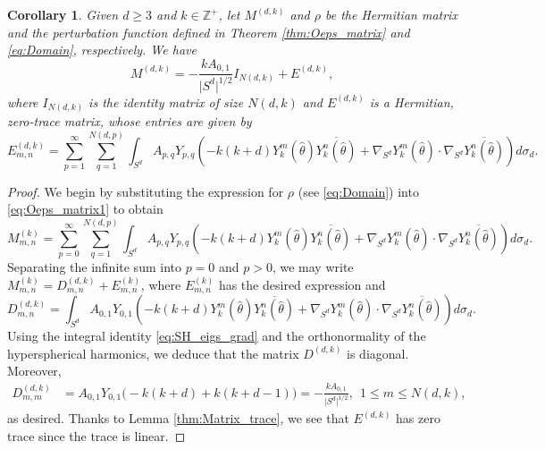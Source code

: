 \documentclass[11pt]{amsart}
\theoremstyle{definition}
\theoremstyle{plain}
\newtheorem{corollary}[definition]{Corollary}
\theoremstyle{remark}
\newcommand{\Z}{\mathbb{Z}}
\newcommand{\abs}[1]{\lvert{#1}\rvert}
\newcommand{\cc}{\overline}
\begin{document}
\begin{corollary} \label{thm:Matrix_sum} 
Given $d\ge 3$ and $k\in\Z^+$, let $M^{(d, k)}$ and $\rho$ be the Hermitian matrix and the perturbation function defined in Theorem \ref{thm:Oeps_matrix} and \eqref{eq:Domain}, respectively. We have 
\begin{equation} 
M^{(d, k)} = -\frac{kA_{0, 1}}{\abs{S^d}^{1/2}}I_{N(d, k)} + E^{(d, k)}, 
\end{equation} 
where $I_{N(d, k)}$ is the identity matrix of size $N(d, k)$ and $E^{(d, k)}$ is a Hermitian, zero-trace matrix, whose entries are given by 
\begin{equation*} 
E_{m, n}^{(d, k)} = \sum_{p = 1}^\infty\sum_{q = 1}^{N(d, p)} \int_{S^d} A_{p, q}Y_{p, q}\left(-k(k + d)Y_k^m(\hat\theta)\cc{Y_k^n(\hat\theta)} + \nabla_{S^d}Y_k^m(\hat\theta)\cdot\nabla_{S^d}\cc{Y_k^n(\hat\theta)}\right) d\sigma_d.
\end{equation*} 
\end{corollary} 
\begin{proof} 
We begin by substituting the expression for $\rho$ (see \eqref{eq:Domain}) into \eqref{eq:Oeps_matrix1} to obtain 
\begin{equation*} 
M_{m, n}^{(k)} = \sum_{p = 0}^\infty\sum_{q = 1}^{N(d, p)} \int_{S^d} A_{p, q}Y_{p, q}\left(-k(k + d)Y_k^m(\hat\theta)\cc{Y_k^n(\hat\theta)} + \nabla_{S^d}Y_k^m(\hat\theta)\cdot\nabla_{S^d}\cc{Y_k^n(\hat\theta)}\right) d\sigma_d. 
\end{equation*} 
Separating the infinite sum into $p = 0$ and $p > 0$, we may write $M_{m, n}^{(k)} = D_{m ,n}^{(d, k)} + E_{m, n}^{(k)}$, where $E_{m, n}^{(k)}$ has the desired expression and 
\begin{equation*} 
D_{m, n}^{(d, k)} = \int_{S^d} A_{0, 1}Y_{0, 1}\left(-k(k + d)Y_k^m(\hat\theta)\cc{Y_k^n(\hat\theta)} + \nabla_{S^d}Y_k^m(\hat\theta)\cdot\nabla_{S^d}\cc{Y_k^n(\hat\theta)}\right) d\sigma_d. 
\end{equation*} 
Using the integral identity \eqref{eq:SH_eigs_grad} and the orthonormality of the hyperspherical harmonics, we deduce that the matrix $D^{(d, k)}$ is diagonal. Moreover, 
\begin{align*} 
D_{m, m}^{(d, k)} & = A_{0, 1}Y_{0, 1}\Big(-k(k + d) + k(k + d - 1)\Big) = -\frac{kA_{0, 1}}{\abs{S^d}^{1/2}}, \ \ 1\le m\le N(d, k), 
\end{align*} 
as desired. Thanks to Lemma \ref{thm:Matrix_trace}, we see that $E^{(d, k)}$ has zero trace since the trace is linear. 
\end{proof} 
\end{document}
